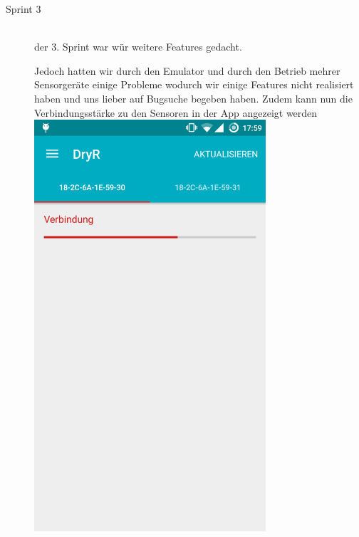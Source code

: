 \begin{description}
\begin{description}
		\end{description}
	\item [Sprint 3] \hfill \\
		der 3. Sprint war wür weitere Features gedacht. 
		\begin{description}
			Jedoch hatten wir durch den Emulator und durch den Betrieb mehrer Sensorgeräte einige Probleme wodurch wir einige Features nicht realisiert haben und uns lieber auf Bugsuche begeben haben. Zudem kann nun die Verbindungsstärke zu den Sensoren in der App angezeigt werden
			\includegraphics[width=0.7\textwidth]{sensor_status_reception.png}

\end{description}
\end{description}
